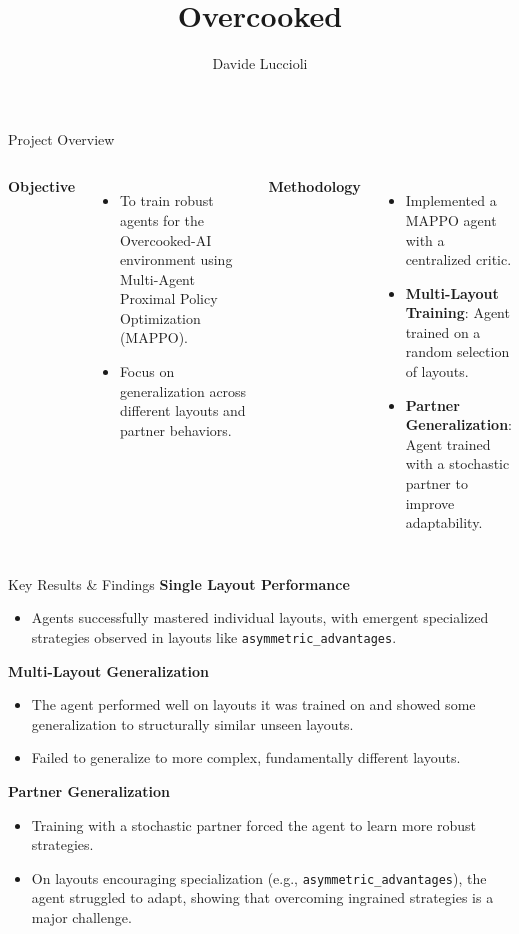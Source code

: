 \documentclass{beamer}
\title{Overcooked}
\author{Davide Luccioli}
\institute{University of Bologna}
\date{}
\begin{document}
\begin{frame}{Project Overview}
  \begin{columns}
    \textbf{Objective}
    \begin{itemize}
      \item To train robust agents for the Overcooked-AI environment using Multi-Agent Proximal Policy Optimization (MAPPO).
      \item Focus on generalization across different layouts and partner behaviors.
    \end{itemize}
    \vfill

    \textbf{Methodology}
    \begin{itemize}
      \item Implemented a MAPPO agent with a centralized critic.
      \item \textbf{Multi-Layout Training}: Agent trained on a random selection of layouts.
      \item \textbf{Partner Generalization}: Agent trained with a stochastic partner to improve adaptability.
    \end{itemize}
  \end{columns}
\end{frame}

\begin{frame}{Key Results \& Findings}
  \textbf{Single Layout Performance}
  \begin{itemize}
    \item Agents successfully mastered individual layouts, with emergent specialized strategies observed in layouts like \texttt{asymmetric\_advantages}.
  \end{itemize}
  
  \textbf{Multi-Layout Generalization}
  \begin{itemize}
    \item The agent performed well on layouts it was trained on and showed some generalization to structurally similar unseen layouts.
    \item Failed to generalize to more complex, fundamentally different layouts.
  \end{itemize}
  
  \textbf{Partner Generalization}
  \begin{itemize}
    \item Training with a stochastic partner forced the agent to learn more robust strategies.
    \item On layouts encouraging specialization (e.g., \texttt{asymmetric\_advantages}), the agent struggled to adapt, showing that overcoming ingrained strategies is a major challenge.
  \end{itemize}
\end{frame}
  
\end{document}
